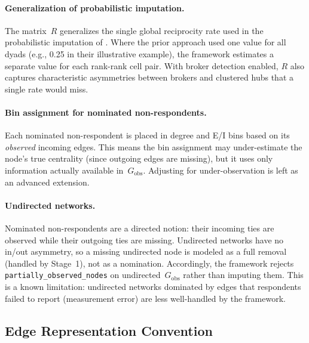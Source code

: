 \documentclass[11pt]{article}
\newcommand{\Gobs}{G_{\text{obs}}}
\newcommand{\Rmat}{R}
\begin{document}
\paragraph{Generalization of probabilistic imputation.} The matrix~$\Rmat$ generalizes the single global reciprocity rate used in the probabilistic imputation of \citet{SmithMorganMoody2022}. Where the prior approach used one value for all dyads (e.g., 0.25 in their illustrative example), the framework estimates a separate value for each rank-rank cell pair. With broker detection enabled, $\Rmat$ also captures characteristic asymmetries between brokers and clustered hubs that a single rate would miss.

\paragraph{Bin assignment for nominated non-respondents.} Each nominated non-respondent is placed in degree and E/I bins based on its \emph{observed} incoming edges. This means the bin assignment may under-estimate the node's true centrality (since outgoing edges are missing), but it uses only information actually available in~$\Gobs$. Adjusting for under-observation is left as an advanced extension.

\paragraph{Undirected networks.} Nominated non-respondents are a directed notion: their incoming ties are observed while their outgoing ties are missing. Undirected networks have no in/out asymmetry, so a missing undirected node is modeled as a full removal (handled by Stage~1), not as a nomination. Accordingly, the framework rejects \texttt{partially\_observed\_nodes} on undirected~$\Gobs$ rather than imputing them. This is a known limitation: undirected networks dominated by edges that respondents failed to report (measurement error) are less well-handled by the framework.

\subsection{Edge Representation Convention}
\end{document}
